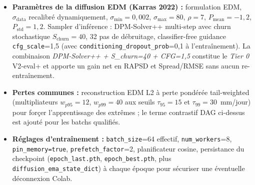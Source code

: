 \documentclass[12pt,a4paper]{article}
\begin{document}
\begin{itemize}
\begin{itemize}
        \item Recalibration de $\sigma_{\text{data}}$ post-Stage~1 (\texttt{sigma\_data\_recalibrate=true}, \texttt{sigma\_min\_scale\_factor}=0{,}02), suivie d'une recalibration \emph{post-Stage~2} (\texttt{sigma\_data\_recalibrate\_post=true}) qui sert de filet de s\'ecurit\'e : si une d\'erive sup\'erieure \`a 10\,\% est d\'etect\'ee, le sampler d'inf\'erence est r\'ealign\'e.
        \item \textbf{Exponential Moving Average (BS37)} : moyenne exponentielle des poids du d\'ecodeur diffusif avec d\'ecalage $\beta_{\text{EMA}}=0{,}9999$, persist\'ee dans chaque checkpoint (cl\'e \texttt{diffusion\_ema\_state\_dict}). Le ph\'enom\`ene de moyenne EMA, propos\'e par \citet*{Karras2022EDM} et reformul\'e par \citet*{Karras2024EDM2}, est l'unique changement le plus impactant entre V2 et V3 : l'inf\'erence finale utilise les poids EMA, pas les poids \emph{live}.
        \item \textbf{Perte contrastive DAG (BS35)} : \`a chaque $N_c=4$ batchs, la perte EDM est \'evalu\'ee deux fois, sur $\mu_{\mathrm{HR}}(A_{\mathrm{dag}})$ et sur $\mu_{\mathrm{HR}}(\mathbf{0})$, et un terme de marge $\lambda_c \max(0, m_c - (\mathcal{L}_{\text{stage2}}^{(0)} - \mathcal{L}_{\text{stage2}}))$ avec $\lambda_c=0{,}5$ et $m_c=0{,}02$ force le d\'ecodeur \`a effectivement exploiter le chemin causal. Un garde-fou dynamique d\'ecro\^it $\lambda_c$ si la sensibilit\'e DAG reste n\'egative deux \'epoques cons\'ecutives, et un m\'ecanisme \emph{auto-tune} substitue l'ablation \texttt{zero} par \texttt{permute} puis \texttt{random} si le signal contrastif s'\'evanouit apr\`es 15 \'epoques.
    \end{itemize}
    \item \textbf{Param\`etres de la diffusion EDM (Karras 2022) :} formulation EDM, $\sigma_{\text{data}}$ recalibr\'e dynamiquement, $\sigma_{\min}=0{,}002$, $\sigma_{\max}=80$, $\rho=7$, $P_{\text{mean}}=-1{,}2$, $P_{\text{std}}=1{,}2$. Sampler d'inf\'erence : DPM-Solver++ multi-step \citep*{Lu2022DPMSolver} avec churn stochastique $S_{\text{churn}}=40$, 32 pas de d\'ebruitage, classifier-free guidance \texttt{cfg\_scale}=1{,}5 (avec \texttt{conditioning\_dropout\_prob}=0{,}1 \`a l'entra\^inement). La combinaison \emph{DPM-Solver++ + S\_churn=40 + CFG=1{,}5} constitue le \emph{Tier 0} V2-eval+ et apporte un gain net en RAPSD et Spread/RMSE sans aucun re-entra\^inement.
    \item \textbf{Pertes communes :} reconstruction EDM L2 \`a perte pond\'er\'ee tail-weighted (multipliateurs $w_{p95}=12$, $w_{p99}=40$ aux seuils $\tau_{95}=15$ et $\tau_{99}=30$~mm/jour) pour for\c{c}er l'apprentissage des extr\^emes ; le terme contrastif DAG ci-dessus est ajout\'e pour les batchs qualifi\'es.
    \item \textbf{R\'eglages d'entra\^inement :} \texttt{batch\_size}=64 effectif, \texttt{num\_workers}=8, \texttt{pin\_memory=true}, \texttt{prefetch\_factor}=2, planificateur cosine, persistance du checkpoint (\texttt{epoch\_last.pth}, \texttt{epoch\_best.pth}, plus \texttt{diffusion\_ema\_state\_dict}) \`a chaque \'epoque pour s\'ecuriser une \'eventuelle d\'econnexion Colab.
\end{itemize}
\end{document}
